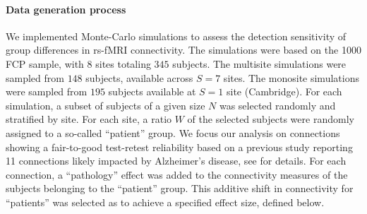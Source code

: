 \documentclass[authoryear]{elsarticle}
\begin{document}
\paragraph{Data generation process}
We implemented Monte-Carlo simulations to assess the detection sensitivity of group differences in rs-fMRI connectivity. The simulations were based on the 1000 FCP sample, with 8 sites totaling $345$ subjects. The multisite simulations were sampled from $148$ subjects, available across $S=7$ sites. The monosite simulations were sampled from $195$ subjects available at $S=1$ site (Cambridge). For each simulation, a subset of subjects of a given size $N$ was selected randomly and stratified by site. For each site, a ratio $W$ of the selected subjects were randomly assigned to a so-called  ``patient'' group. 
We focus our analysis on connections showing a fair-to-good test-retest reliability based on a previous study reporting 11 connections likely impacted by Alzheimer's disease, see \cite{Orban2015} for details. For each connection, a ``pathology'' effect was added to the connectivity measures of the subjects belonging to the ``patient'' group. This additive shift in connectivity for ``patients'' was selected as to achieve a specified effect size, defined below. 

% 
% 

\end{document}
